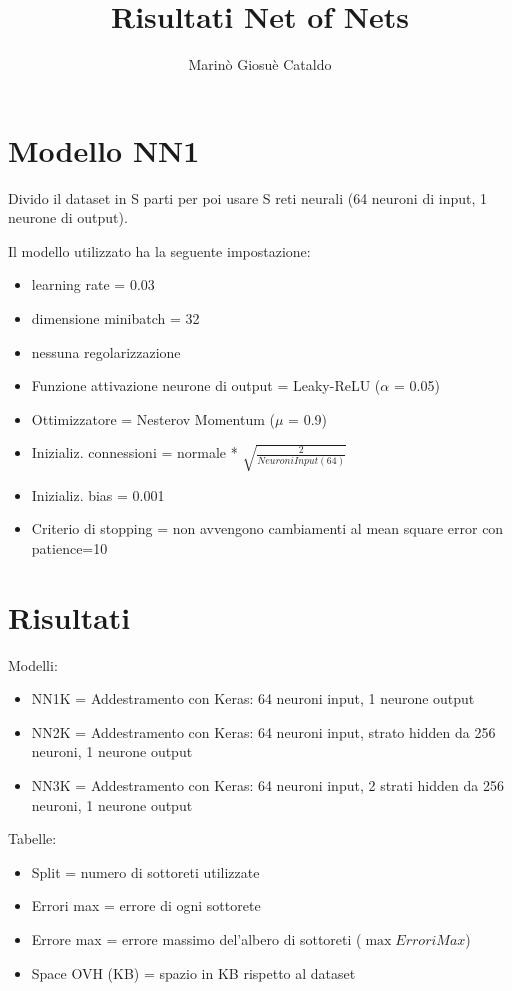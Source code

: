 \documentclass[]{article}
\title{Risultati Net of Nets}
\author{Marinò Giosuè Cataldo}
\begin{document}
	
	\section{Modello NN1}
	Divido il dataset in S parti per poi usare S reti neurali (64 neuroni di input, 1 neurone di output).
	
	Il modello utilizzato ha la seguente impostazione:
	\begin{itemize}
		\item learning rate = 0.03
		\item dimensione minibatch = 32
		\item nessuna regolarizzazione
		\item Funzione attivazione neurone di output = Leaky-ReLU ($\alpha$ = 0.05)
		\item Ottimizzatore = Nesterov Momentum ($\mu$ = 0.9)
		\item Inizializ. connessioni = normale * $\sqrt{\frac{2}{NeuroniInput(64)}}$		
		\item Inizializ. bias = 0.001
		\item Criterio di stopping = non avvengono cambiamenti al mean square error con patience=10	
	\end{itemize}
	
	


\section{Risultati}
	Modelli:
	\begin{itemize}
		\item NN1K = Addestramento con Keras: 64 neuroni input, 1 neurone output
		\item NN2K = Addestramento con Keras: 64 neuroni input, strato hidden da 256 neuroni, 1 neurone output
		\item NN3K = Addestramento con Keras: 64 neuroni input, 2 strati hidden da 256 neuroni, 1 neurone output
	\end{itemize}
	Tabelle:
	\begin{itemize}
		\item Split = numero di sottoreti utilizzate
		\item Errori max = errore di ogni sottorete
		\item Errore max = errore massimo del'albero di sottoreti ($\max{ErroriMax}$)
		\item Space OVH (KB) = spazio in KB rispetto al dataset
	\end{itemize}
	
\end{document}
